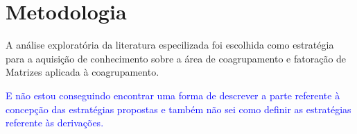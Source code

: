 \documentclass[
    12pt,                %
    oneside,            %
    a4paper,            %
    english,            %
    brazil                %
    ]{abntex2ppgsi}
\begin{document}



\section{Metodologia}

A análise exploratória da literatura especilizada foi escolhida como estratégia para a aquisição de conhecimento sobre a área de coagrupamento e fatoração de Matrizes aplicada à coagrupamento.

\textcolor{blue}{E não estou conseguindo encontrar uma forma de descrever a parte referente à concepção das estratégias propostas e também não sei como definir as estratégias referente às derivações.}

\end{document}
